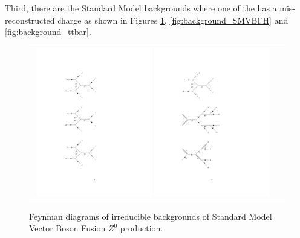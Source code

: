 Third, there are the Standard Model backgrounds where one of the \hadtau has a mis-reconstructed charge as shown in Figures \ref{fig:background_SMVBFZ0}, \ref{fig:background_SMVBFH} and \ref{fig:background_ttbar}. 

\begin{figure}[tbh!]
	\centering
	\begin{tabular}{cc}
		\includegraphics[width=0.48\textwidth]{diagrams/pics/background_SMVBFZ0Z0.pdf}
		\includegraphics[width=0.48\textwidth]{diagrams/pics/background_SMVBFZ0W.pdf} 		
	\end{tabular}
	\caption{Feynman diagrams of irreducible backgrounds of Standard Model Vector Boson Fusion $Z^{0}$ production. }
	\label{fig:background_SMVBFZ0}
\end{figure}

